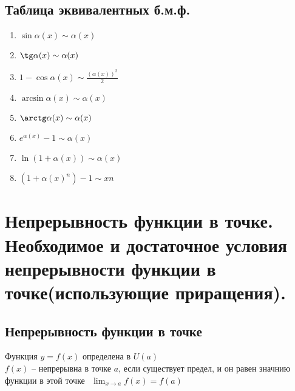 \documentclass[12pt, fleqn]{article}
\begin{document}
\subsection{Таблица эквивалентных б.м.ф.}
\begin{enumerate}
	\item $\sin \alpha(x) \sim \alpha(x)$
	\item $\tg \alpha(x) \sim \alpha(x)$
	\item $1-\cos \alpha(x)\sim \frac{\left(\alpha(x)\right)^2}{2}$
	\item $\arcsin \alpha(x)\sim \alpha(x)$
	\item $\arctg \alpha(x)\sim\alpha(x)$
	\item $e^{\alpha(x)}-1\sim \alpha(x)$
	\item $\ln(1+\alpha(x))\sim \alpha(x)$
	\item $ \left(1+\alpha(x)^n\right)-1\sim xn$
\end{enumerate}
\section{Непрерывность функции в точке. Необходимое и достаточное условия непрерывности функции в точке(использующие приращения).}
\subsection{Непрерывность функции в точке}
Функция $y=f(x)$ определена в $U(a)$\\
$f(x)$ -- непрерывна в точке $a$, если существует предел, и он равен значнию функции в этой точке $\begin{gathered}
	\lim_{x\to a} f(x)= f(a)
\end{gathered}$
\end{document}

